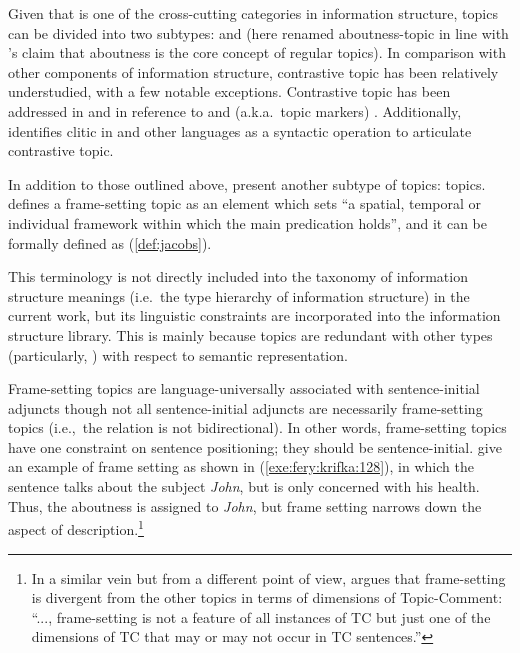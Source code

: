 Given that  is one of the cross-cutting categories in
information structure, topics can be divided into two subtypes:
 and  (here renamed
aboutness-topic in line with \citeauthor{choi:99}'s claim that
aboutness is the core concept of regular topics).  In comparison with
other components of information structure, contrastive topic has been
relatively understudied, with a few notable exceptions.  Contrastive
topic has been addressed in  and  in
reference to \wa and \nun (a.k.a.\ topic markers)
\citep{kuno:73,choi:99}. Additionally, \citet{arregi:03} identifies
clitic  in  and other languages as
a syntactic operation to articulate contrastive topic.


In addition to those outlined above, \citet{fery:krifka:08} present
another subtype of topics:  topics.
\cite[p.\ 50]{chafe:76} defines a frame-setting topic as an element
which sets ``a spatial, temporal or individual framework within which
the main predication holds'', and it can be formally defined as
(\ref{def:jacobs}).



\noindent This terminology is not directly included into the taxonomy
of information structure meanings (i.e.\ the type hierarchy of
information structure) in the current work, but its linguistic
constraints are incorporated into the information structure
library. This is mainly because  topics are
redundant with other  types (particularly, )
with respect to semantic representation.


Frame-setting topics are language-universally associated with
sentence-initial adjuncts \citep[p.\ 118]{lambrecht:96} though not all
sentence-initial adjuncts are necessarily frame-setting topics
(i.e.,\ the relation is not bidirectional). In other
words, frame-setting topics have one constraint on sentence
positioning; they should be sentence-initial.  \citet{fery:krifka:08}
give an example of frame setting as shown in
(\ref{exe:fery:krifka:128}), in which the sentence talks about the
subject \textit{John}, but is only concerned with his health. Thus,
the aboutness  is assigned to \textit{John}, but frame setting
narrows down the aspect of description.\footnote{In a similar vein but
  from a different point of view, \citet[p.\ 656]{jacobs:01} argues
  that frame-setting is divergent from the other topics in terms of
  dimensions of Topic-Comment: ``..., frame-setting is not a feature
  of all instances of TC but just one of the dimensions of TC that may
  or may not occur in TC sentences.''  }


